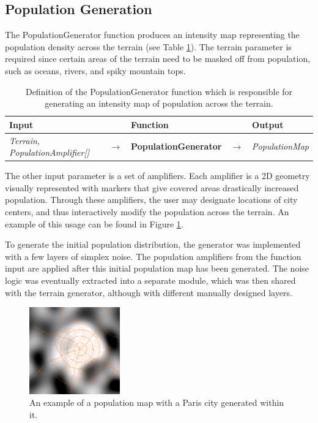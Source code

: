 \subsection{Population Generation}

The PopulationGenerator function produces an intensity map representing the population density across the terrain (see Table \ref{table:popgen}).
The terrain parameter is required since certain areas of the terrain need to be masked off from population, such as oceans, rivers, and spiky mountain tops.
\begin{table}[H]
  \centering
  \begin{tabular}{lllll}
    \textbf{Input}                           &               & \textbf{Function}            &               & \textbf{Output}         \\
    \midrule
    \textit{Terrain, PopulationAmplifier[]}      & $\rightarrow$ & \textbf{PopulationGenerator}      & $\rightarrow$ & \textit{PopulationMap}        \\
    \bottomrule
  \end{tabular}

  \caption{Definition of the PopulationGenerator function which is responsible for generating an intensity map of population across the terrain.}
  \label{table:popgen}
\end{table}
\vspace{-0.4cm} %

The other input parameter is a set of amplifiers.
Each amplifier is a 2D geometry visually represented with markers that give covered areas drastically increased population.
Through these amplifiers, the user may designate locations of city centers, and thus interactively modify the population across the terrain.
An example of this usage can be found in Figure \ref{fig:pop_dens}.

To generate the initial population distribution, the generator was implemented with a few layers of simplex noise.
The population amplifiers from the function input are applied after this initial population map has been generated.
The noise logic was eventually extracted into a separate module, which was then shared with the terrain generator, although with different manually designed layers.

\begin{figure}[h!]
  \centering
  \includegraphics[width=0.35\textwidth]{figure/pop_density.png}
  \caption{An example of a population map with a Paris city generated within it.}
  \label{fig:pop_dens}
\end{figure}